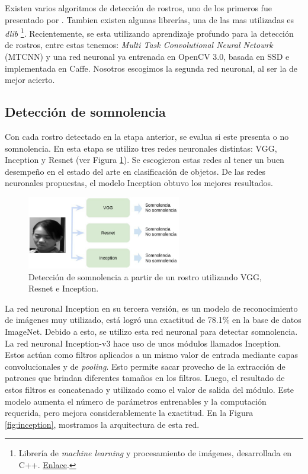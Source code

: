 \documentclass{article}
\begin{document}
	Existen varios algoritmos de detección de rostros, uno de los primeros fue presentado por  \cite{viola2004robust}. Tambien existen algunas librerías, una de las mas utilizadas es \textit{dlib} \footnote{Librería de \textit{machine learning} y procesamiento de imágenes, desarrollada en C++. \href{http://dlib.net/}{Enlace}.}. Recientemente, se esta utilizando aprendizaje profundo para la detección de rostros, entre estas tenemos: \textit{Multi Task Convolutional Neural Netowrk} (MTCNN) \citep{zhang2016joint} y una red neuronal ya entrenada en OpenCV 3.0, basada en SSD e implementada en Caffe. Nosotros escogimos la segunda red neuronal, al ser la de mejor acierto.
	
	\subsection{Detección de somnolencia}
	
	Con cada rostro detectado en la etapa anterior, se evalua si este presenta o no somnolencia. En esta etapa se utilizo tres redes neuronales distintas: VGG, Inception y Resnet (ver Figura \ref{fig:drowsy}). Se escogieron estas redes al tener un buen desempeño en el estado del arte en clasificación de objetos. De las redes neuronales propuestas, el modelo Inception obtuvo los mejores resultados.
	
	\begin{figure}[H]
		\centering
		\includegraphics[width=0.6\textwidth]{img/drowsy}		
		\caption{Detección de somnolencia a partir de un rostro utilizando VGG, Resnet e Inception.}
		\label{fig:drowsy}
	\end{figure}
	
	La red neuronal Inception \cite{szegedy2016rethinking} en su tercera versión, es un modelo de reconocimiento de imágenes muy utilizado, está logró una exactitud de 78.1\% en la base de datos ImageNet. Debido a esto, se utilizo esta red neuronal para detectar somnolencia. \\
	
	La red neuronal Inception-v3 hace uso de unos módulos llamados Inception. Estos actúan como filtros aplicados a un mismo valor de entrada mediante capas convolucionales y de \textit{pooling}. Esto permite sacar provecho de la extracción de patrones que brindan diferentes tamaños en los filtros. Luego, el resultado de estos filtros es concatenado y utilizado como el valor de salida del módulo. Este modelo aumenta el número de parámetros entrenables y la computación requerida, pero mejora considerablemente la exactitud. En la Figura \ref{fig:inception}, mostramos la arquitectura de esta red.
	
\end{document}
